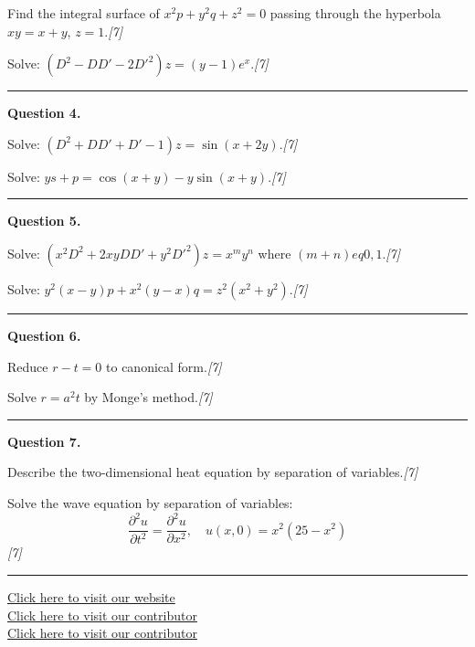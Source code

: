 \documentclass[11pt,a4paper]{article}
\newcommand{\pts}[1]{\hfill   \textit{[#1]}}
\begin{document}
\begin{parts}
  \item Find the integral surface of $x^2p+y^2q+z^2=0$ passing through the hyperbola $xy=x+y$, $z=1$.\pts{7}
  \item Solve: $(D^2-DD'-2D'^2)z=(y-1)e^x$.\pts{7}
\end{parts}
\medskip\rule{\linewidth}{0.2pt}

\medskip


\noindent   \textbf{Question 4.}

\begin{parts}
  \item Solve: $(D^2+DD'+D'-1)z=\sin(x+2y)$.\pts{7}
  \item Solve: $ys+p=\cos(x+y)-y\sin(x+y)$.\pts{7}
\end{parts}
\medskip\rule{\linewidth}{0.2pt}

\medskip


\noindent   \textbf{Question 5.}

\begin{parts}
  \item Solve: $(x^2D^2+2xyDD'+y^2D'^2)z=x^my^n$ where $(m+n)
eq0,1$.\pts{7}
  \item Solve: $y^2(x-y)p+x^2(y-x)q=z^2(x^2+y^2)$.\pts{7}
\end{parts}
\medskip\rule{\linewidth}{0.2pt}

\medskip


\noindent   \textbf{Question 6.}

\begin{parts}
  \item Reduce $r-t=0$ to canonical form.\pts{7}
  \item Solve $r=a^2t$ by Monge's method.\pts{7}
\end{parts}
\medskip\rule{\linewidth}{0.2pt}

\medskip


\noindent   \textbf{Question 7.}

\begin{parts}
  \item Describe the two-dimensional heat equation by separation of variables.\pts{7}
  \item Solve the wave equation by separation of variables:
  \[
    \frac{\partial^2 u}{\partial t^2}=\frac{\partial^2 u}{\partial x^2},\quad u(x,0)=x^2(25-x^2)
  \]
  \pts{7}
\end{parts}

\vfill\rule{\linewidth}{0.4pt}

\begin{center}\small
\href{https://bhu-exam.vercel.app/}{Click here to visit our website}\\[4pt]
\href{https://me-aryan.vercel.app/}{Click here to visit our contributor}\\[4pt]
\href{https://quashan-me.vercel.app/}{Click here to visit our contributor}
\end{center}
\end{document}
